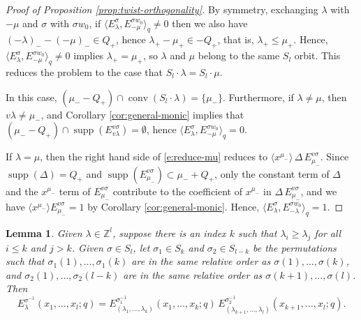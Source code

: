 \documentclass[12pt]{amsart}
\newtheorem{lemma}[thm]{Lemma}
\theoremstyle{definition}
\theoremstyle{remark}
\newcommand{\ZZ}{{\mathbb Z}}
\DeclareMathOperator{\conv}{conv}
\DeclareMathOperator{\supp}{supp}
\begin{document}
\begin{proof}[Proof of Proposition \ref{prop:twist-orthogonality}]
By symmetry, exchanging $\lambda $ with $-\mu $ and $\sigma $ with
$\sigma w_{0}$, if $\langle E^{\sigma }_{\lambda }, E^{\sigma
w_{0}}_{-\mu } \rangle _{q}\not =0$ then we also have $(-\lambda )_{-}
- (-\mu )_{-}\in Q_{+}$, hence $\lambda _{+}-\mu _{+}\in -Q_{+}$, that
is, $\lambda _{+}\leq \mu _{+}$.  Hence, $\langle E^{\sigma }_{\lambda
}, E^{\sigma w_{0}}_{-\mu } \rangle _{q}\not =0$ implies $\lambda _{+}
= \mu _{+}$, so $\lambda $ and $\mu $ belong to the same $S_{l}$
orbit.  This reduces the problem to the case that $S_{l}\cdot\lambda =
S_{l}\cdot \mu $.

In this case, $(\mu _{-}-Q_{+})\cap \conv (S_{l}\cdot \lambda ) =
\{\mu _{-} \}$.  Furthermore, if $\lambda \not =\mu $, then $v \lambda
\not =\mu _{-}$, and Corollary \ref{cor:general-monic} implies that
$(\mu _{-}-Q_{+})\cap \supp (E^{v \sigma }_{v \lambda }) = \emptyset
$, hence $\langle E^{\sigma }_{\lambda }, E^{\sigma w_{0}}_{-\mu }
\rangle _{q} =0$.


If $\lambda =\mu $, then the right hand side of \eqref{e:reduce-mu}
reduces to $\langle x^{\mu _{-}} \rangle\, \Delta\, E^{v \sigma
}_{\mu _{-}}$.  Since $\supp (\Delta)=Q_{+}$ and $\supp (E^{v
\sigma }_{\mu _{-}})\subset \mu _{-}+Q_{+}$, only the constant term of
$\Delta$ and the $x^{\mu _{-}}$ term of $E^{v\sigma }_{\mu
_{-}}$ contribute to the coefficient of $x^{\mu _{-}}$ in $\Delta \,
E^{v \sigma }_{\mu _{-}}$, and we have $\langle x^{\mu _{-}}
\rangle E^{v\sigma }_{\mu _{-}} = 1$ by Corollary
\ref{cor:general-monic}.  Hence, $\langle E^{\sigma }_{\lambda },
E^{\sigma w_{0}}_{-\lambda } \rangle _{q} =1$.
\end{proof}

\begin{lemma}\label{lem:factorization}
Given $\lambda \in \ZZ ^{l}$, suppose there is an index $k$ such that
$\lambda _{i}\geq \lambda _{j}$ for all $i\leq k$ and $j>k$.  Given
$\sigma \in S_{l}$, let $\sigma _{1}\in S_{k}$ and $\sigma _{2}\in
S_{l-k}$ be the permutations such that $\sigma _{1}(1),\ldots,\sigma
_{1}(k)$ are in the same relative order as $\sigma (1),\ldots,\sigma
(k)$, and $\sigma _{2}(1),\ldots,\sigma _{2}(l-k)$ are in the same
relative order as $\sigma (k+1),\ldots,\sigma (l)$.  Then
\begin{equation}\label{e:factorization}
E^{\sigma ^{-1}}_{\lambda }(x_{1},\ldots,x_{l};q) = E^{\sigma_{1}
^{-1}}_{(\lambda_{1},\ldots,\lambda _{k}) }(x_{1},\ldots,x_{k};q)\,
E^{\sigma_{2} ^{-1}}_{(\lambda_{k+1},\ldots,\lambda _{l})
}(x_{k+1},\ldots,x_{l};q).
\end{equation}
\end{lemma}
\end{document}
